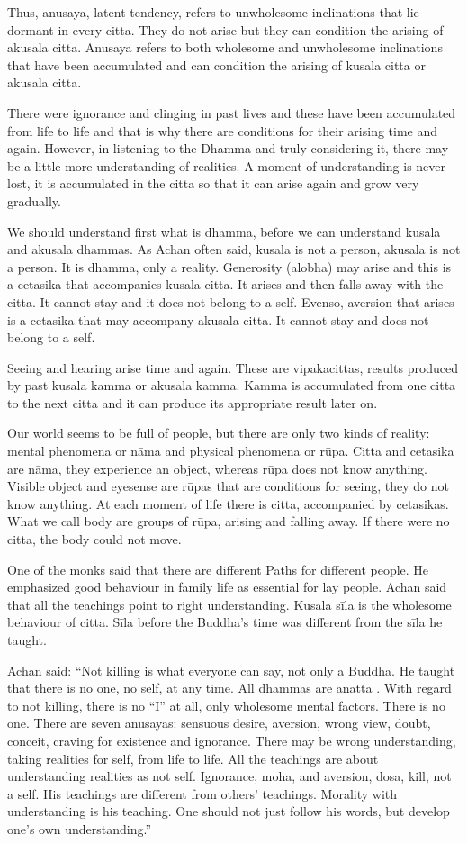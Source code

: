 Thus, anusaya, latent tendency, refers to unwholesome inclinations that lie dormant 
in every citta. They do not arise but they can condition the arising of akusala citta. 
Anusaya refers to both wholesome and unwholesome inclinations that have been accumulated and can condition the arising of kusala citta or akusala citta. 

There were ignorance and clinging in past lives and these have been accumulated 
from life to life and that is why there are conditions for their arising time and again. 
However, in listening to the Dhamma and truly considering it, there may be a little 
more understanding of realities. A moment of understanding is never lost, it is accumulated in the citta so that it can arise again and grow very gradually. 

We should understand first what is dhamma, before we can understand kusala and 
akusala dhammas. As Achan often said, kusala is not a person, akusala is not a person. It is dhamma, only a reality. Generosity (alobha) may arise and this is a cetasika 
that accompanies kusala citta. It arises and then falls away with the citta. It cannot 
stay and it does not belong to a self. Evenso, aversion that arises is a cetasika that 
may accompany akusala citta. It cannot stay and does not belong to a self. 

Seeing and hearing arise time and again. These are vipakacittas, results produced by 
past kusala kamma or akusala kamma. Kamma is accumulated from one citta to the 
next citta and it can produce its appropriate result later on. 

Our world seems to be full of people, but there are only two kinds of reality: mental 
phenomena or nāma and physical phenomena or rūpa. Citta and cetasika are nāma, 
they experience an object, whereas rūpa does not know anything. Visible object and 
eyesense are rūpas that are conditions for seeing, they do not know anything. At each 
moment of life there is citta, accompanied by cetasikas. What we call body are 
groups of rūpa, arising and falling away. If there were no citta, the body could not 
move. 

One of the monks said that there are different Paths for different people. He emphasized good behaviour in family life as essential for lay people. Achan said that all the 
teachings point to right understanding. Kusala sīla is the wholesome behaviour of 
citta. Sīla before the Buddha’s time was different from the sīla he taught. 

Achan said: ``Not killing is what everyone can say, not only a Buddha. He taught 
that there is no one, no self, at any time. All dhammas are anattā . With regard to not 
killing, there is no ``I'' at all, only wholesome mental factors. There is no one. There are seven anusayas: sensuous desire, aversion, wrong view, doubt, conceit, craving for 
existence and ignorance. There may be wrong understanding, taking realities for self, from life to life. All the teachings are about understanding realities as not self. Ignorance, moha, and aversion, 
dosa, kill, not a self. His teachings are different from others' teachings. Morality with 
understanding is his teaching. One should not just follow his words, but develop one’s 
own understanding.'' 

